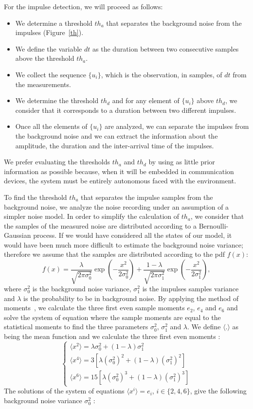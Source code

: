 \documentclass[journal]{IEEEtran}
\begin{document}
For the impulse detection, we will proceed as follows:
\begin{itemize}
  \item We determine a threshold $th_a$ that separates the background noise from the impulses (Figure~\ref{th}).
  \item We define the variable $dt$ as the duration between two consecutive samples above the threshold $th_a$.
  \item We collect the sequence $\{u_i\}$, which is the observation, in samples, of $dt$ from the measurements.
  \item We determine the threshold $th_d$ and for any element of $\{u_i\}$ above $th_d$, we consider that it corresponds to a duration between two different impulses.
  \item Once all the elements of $\{u_i\}$ are analyzed, we can separate the impulses from the background noise and we can extract the information about the amplitude, the duration and the inter-arrival time of the impulses.
\end{itemize}
We prefer evaluating the thresholds $th_a$ and $th_d$ by using as little prior information as possible because, when it will be embedded in communication devices, the system must be entirely autonomous faced with the environment.\

To find the threshold $th_a$ that separates the impulse samples from the background noise, we analyze the noise recording under an assumption of a simpler noise model. In order to simplify the calculation of $th_a$, we consider that the samples of the measured noise are distributed according to a Bernoulli-Gaussian process. If we would have considered all the states of our model, it would have been much more difficult to estimate the background noise variance; therefore we assume that the samples are distributed according to the pdf $f(x)$:
\begin{equation}\label{awgn}
    f(x)=\frac{\lambda}{\sqrt{2\pi\sigma_0^2}}\exp(-\frac{x^2}{2\sigma_0^2})+\frac{1-\lambda}{\sqrt{2\pi\sigma_1^2}}\exp(-\frac{x^2}{2\sigma_1^2}),
\end{equation}
where $\sigma^2_0$ is the background noise variance, $\sigma^2_1$ is the impulses samples variance and $\lambda$ is the probability to be in background noise.
By applying the method of moments~\cite{zabin1}, we calculate the three first even sample moments $e_2$, $e_4$ and $e_6$ and solve the system of equation where the sample moments are equal to the statistical moments to find the three parameters $\sigma_0^2$, $\sigma_1^2$ and $\lambda$. We define $\langle . \rangle $ as being the mean function and we calculate the three first even moments :
      $$
\left\{
    \begin{array}{lll}
        \langle x^2 \rangle = \lambda\sigma_0^2+(1-\lambda)\sigma_1^2  \\
        \langle x^4 \rangle = 3[\lambda{(\sigma_0^2)}^2+(1-\lambda){(\sigma_1^2)}^2] \\
        \langle x^6 \rangle = 15[\lambda {(\sigma_0^2)}^3+(1-\lambda){(\sigma_1^2)}^3]
    \end{array}
\right.
$$
The solutions of the system of equations $\langle x^i \rangle=e_i $, $i\in\{2,4,6\}$, give the following background noise variance $\sigma_0^2$ :
\end{document}
